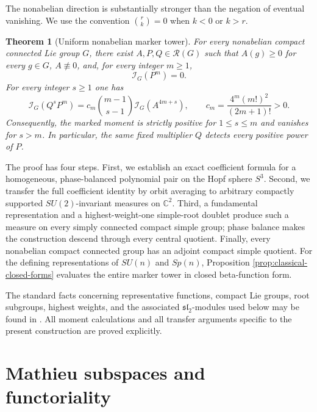 \documentclass[11pt]{article}
\numberwithin{equation}{section}
\newtheorem{theorem}{Theorem}[section]
\newcommand{\C}{\mathbb C}
\newcommand{\cR}{\mathcal R}
\newcommand{\cI}{\mathcal I}
\begin{document}
The nonabelian direction is substantially stronger than the negation of
eventual vanishing.  We use the convention
$\binom{r}{k}=0$ when $k<0$ or $k>r$.

\begin{theorem}[Uniform nonabelian marker tower]\label{thm:uniform-nonabelian}
For every nonabelian compact connected Lie group $G$, there exist
$A,P,Q\in\cR(G)$ such that $A(g)\geq0$ for every $g\in G$, $A\not\equiv0$, and,
for every integer $m\geq1$,
\begin{equation}\label{eq:uniform-pure}
 \cI_G(P^m)=0.
\end{equation}
For every integer $s\geq1$ one has
\begin{equation}\label{eq:uniform-marker-tower}
 \cI_G(Q^sP^m)
 =c_m\binom{m-1}{s-1}\cI_G(A^{4m+s}),
 \qquad
 c_m=\frac{4^m(m!)^2}{(2m+1)!}>0.
\end{equation}
Consequently, the marked moment is strictly positive for $1\leq s\leq m$ and
vanishes for $s>m$.  In particular, the same fixed multiplier $Q$ detects
every positive power of $P$.
\end{theorem}

The proof has four steps.  First, we establish an exact coefficient formula
for a homogeneous, phase-balanced polynomial pair on the Hopf sphere $S^3$.
Second, we transfer the full coefficient identity by orbit averaging to
arbitrary compactly supported $SU(2)$-invariant measures on $\C^2$.  Third, a
fundamental representation and a highest-weight-one simple-root doublet
produce such a measure on every simply connected compact simple group; phase
balance makes the construction descend through every central quotient.
Finally, every nonabelian compact connected group has an adjoint compact
simple quotient.
For the defining representations of $SU(n)$ and $Sp(n)$, Proposition
\ref{prop:classical-closed-forms} evaluates the entire marker tower in closed
beta-function form.

The standard facts concerning representative functions, compact Lie groups,
root subgroups, highest weights, and the associated $\mathfrak{sl}_2$-modules
used below may be found in \cite{BrockerTomDieck1985,Hall2015}.  All moment
calculations and all transfer arguments specific to the present construction
are proved explicitly.

\section{Mathieu subspaces and functoriality}
\end{document}
